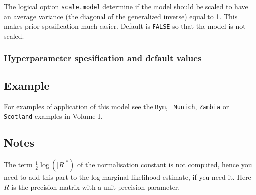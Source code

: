 \documentclass[a4paper,11pt]{article}
\begin{document}
The logical option \verb|scale.model| determine if the model should be
scaled to have an average variance (the diagonal of the generalized
inverse) equal to 1. This makes prior spesification much
easier. Default is \verb|FALSE| so that the model is not scaled.


\subsubsection*{Hyperparameter spesification and default values}


\subsection*{Example}

For examples of application of this model see the {\tt Bym}, {\tt
    Munich}, {\tt Zambia} or {\tt Scotland} examples in Volume I.



\subsection*{Notes}

The term $\frac{1}{2}\log(|R|^{*})$ of the normalisation constant is
not computed, hence you need to add this part to the log marginal
likelihood estimate, if you need it. Here $R$ is the precision matrix
with a unit precision parameter.
\end{document}
